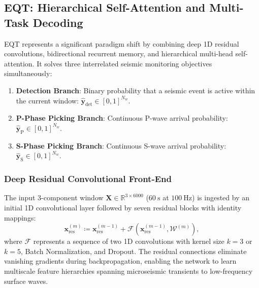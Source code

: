 \subsection{\acs{EQT}: Hierarchical Self-Attention and Multi-Task Decoding}
\acf{EQT} represents a significant paradigm shift by combining deep 1D
residual convolutions, bidirectional recurrent memory, and
hierarchical multi-head self-attention. It solves three interrelated
seismic monitoring objectives simultaneously:
\begin{enumerate}
  \item \textbf{Detection Branch}: Binary probability that a seismic
    event is active within the current window:
    $\hat{\mathbf{y}}_{\mathrm{det}} \in [0, 1]^{N_w}$.
  \item \textbf{P-Phase Picking Branch}: Continuous P-wave arrival
    probability: $\hat{\mathbf{y}}_{\mathrm{P}} \in [0, 1]^{N_w}$.
  \item \textbf{S-Phase Picking Branch}: Continuous S-wave arrival
    probability: $\hat{\mathbf{y}}_{\mathrm{S}} \in [0, 1]^{N_w}$.
\end{enumerate}

\subsubsection{Deep Residual Convolutional Front-End}
The input 3-component window $\mathbf{X} \in \mathbb{R}^{3 \times
\num{6000}}$ ($\qty{60}{\second}$ at $\qty{100}{\hertz}$) is ingested by an
initial 1D convolutional layer followed by seven residual blocks
with identity mappings:
\begin{equation}
  \mathbf{x}_{\mathrm{res}}^{(m)} \coloneqq
  \mathbf{x}_{\mathrm{res}}^{(m - 1)} + \mathcal{F}\left(
  \mathbf{x}_{\mathrm{res}}^{(m - 1)}, \mathcal{W}^{(m)} \right),
\end{equation}
where $\mathcal{F}$ represents a sequence of two 1D convolutions
with kernel size $k = 3$ or $k = 5$, Batch Normalization, and Dropout.
The residual connections eliminate vanishing gradients during
backpropagation, enabling the network to learn multiscale feature
hierarchies spanning microseismic transients to low-frequency surface waves.

